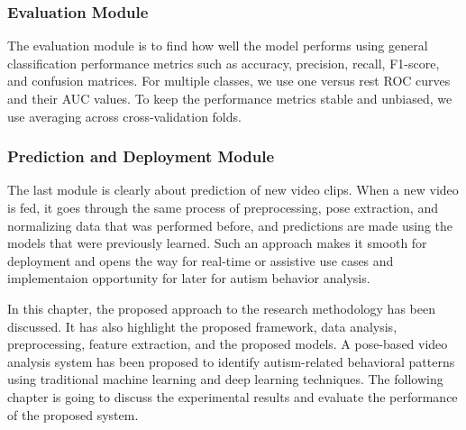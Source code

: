 \subsubsection{Evaluation Module}
The evaluation module is to find how well the model performs using general classification performance metrics such as accuracy, precision, recall, F1-score, and confusion matrices. For multiple classes, we use one versus rest ROC curves and their AUC values. To keep the performance metrics stable and unbiased, we use averaging across cross-validation folds.

\subsubsection{Prediction and Deployment Module}
The last module is clearly about prediction of new video clips. When a new video is fed, it goes through the same process of preprocessing, pose extraction, and normalizing data that was performed before, and predictions are made using the models that were previously learned. Such an approach makes it smooth for deployment and opens the way for real-time or assistive use cases  and implementaion opportunity for later for autism behavior analysis.

In this chapter, the proposed approach to the research methodology has been discussed. It has also highlight the proposed framework, data analysis, preprocessing, feature extraction, and the proposed models. A pose-based video analysis system has been proposed to identify autism-related behavioral patterns using traditional machine learning and deep learning techniques. The following chapter is going to discuss the experimental results and evaluate the performance of the proposed system.

